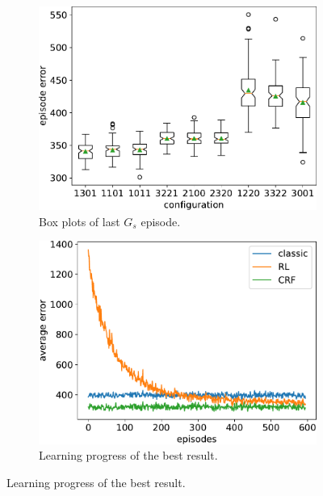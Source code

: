 \newcommand{\figfactor}{0.45}
\begin{figure}[t!]
  \bigskip
  \begin{subfigure}[t]{\figfactor\textwidth}
    \centering
    \includegraphics[width=\textwidth]{papers/coordination2022/img/box-all.pdf}
    \caption{Box plots of last $G_s$ episode.}
    \label{coordination2022:subfig:boxplot}
  \end{subfigure}  
  \hfill
  \begin{subfigure}[t]{\figfactor\textwidth}
    \centering
    \includegraphics[width=\textwidth]{papers/coordination2022/img/mean-error-left.pdf}
    \caption{Learning progress of the best result.}
    \label{coordination2022:subfig:mean-error-over-episode}
  \end{subfigure}
  \bigskip
  

\end{figure}
